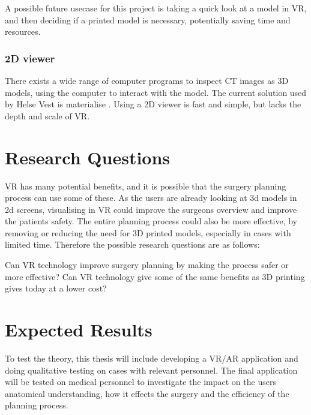 \documentclass[11pt]{scrartcl}
\begin{document}
A possible future usecase for this project is taking a quick look at a model in VR, and then deciding if a printed model is necessary, potentially saving time and resources.

\subsubsection {2D viewer}

There exists a wide range of computer programs to inspect CT images as 3D models, using the computer to interact with the model.
The current solution used by Helse Vest is materialise \cite{materialise}. Using a 2D viewer is fast and simple, but lacks the depth and scale of VR.


\section{Research Questions}
VR has many potential benefits, and it is possible that the surgery planning
process can use some of these. As the users are already looking at 3d models in
2d screens, visualising in VR could improve the surgeons overview and improve the patients safety. The entire planning process could also be more effective, by removing or reducing the need for 3D printed models, especially in cases with limited time. Therefore the possible research questions are as follows:

Can VR technology improve surgery planning by making the process safer or more effective?
Can VR technology give some of the same benefits as 3D printing gives today at a lower cost?


\section{Expected Results}
To test the theory, this thesis will include developing a VR/AR application and
doing qualitative testing on cases with relevant personnel.
The final application will be tested on medical personnel to investigate the impact on the users anatomical understanding, how it effects the surgery and the efficiency of the planning process. 
\end{document}
